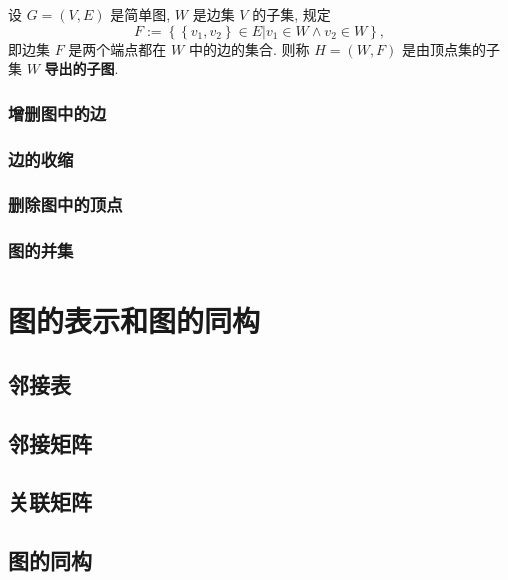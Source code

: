 \documentclass[10pt,UTF8]{book} %
\begin{document}
\begin{definition}
    设 $G = (V, E)$ 是简单图, $W$ 是边集 $V$ 的子集, 规定
    \[ F := \left\{ \left\{v_1, v_2\right\} \in E |
    v_1 \in W \wedge v_2 \in W \right\}, \]
    即边集 $F$ 是两个端点都在 $W$ 中的边的集合. 则称 $H = (W, F)$ 是由顶点集的子集 $W$
    \textbf{导出的子图}.
\end{definition}

\subsubsection{增删图中的边}
\subsubsection{边的收缩}
\subsubsection{删除图中的顶点}
\subsubsection{图的并集}

\newpage
\section{图的表示和图的同构}

\subsection{邻接表}
\subsection{邻接矩阵}
\subsection{关联矩阵}
\subsection{图的同构}
\end{document}
